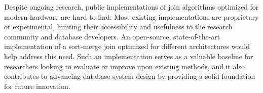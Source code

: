 Despite ongoing research, public implementations of join algorithms optimized for modern hardware
are hard to find. Most existing implementations are proprietary or experimental, limiting their
accessibility and usefulness to the research community and database developers. An open-source,
state-of-the-art implementation of a sort-merge join optimized for different architectures would
help address this need. Such an implementation serves as a valuable baseline for researchers
looking to evaluate or improve upon existing methods, and it also contributes to advancing database
system design by providing a solid foundation for future innovation.



